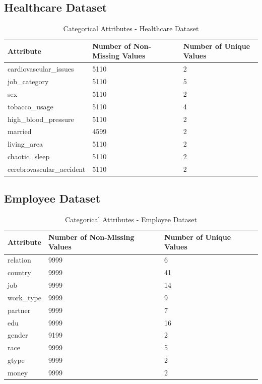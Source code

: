 \documentclass[a4paper,12pt]{article}
\begin{document}
\subsection{Healthcare Dataset}

\begin{table}[h!]
\centering
\caption{Categorical Attributes - Healthcare Dataset}
\vspace{0.5cm}
\small
\begin{tabularx}{\textwidth}{|l|X|X|}
\hline
\textbf{Attribute} & \textbf{Number of Non-Missing Values} & \textbf{Number of Unique Values} \\ \hline
cardiovascular\_issues & 5110 & 2 \\ \hline
job\_category & 5110 & 5 \\ \hline
sex & 5110 & 2 \\ \hline
tobacco\_usage & 5110 & 4 \\ \hline
high\_blood\_pressure & 5110 & 2 \\ \hline
married & 4599 & 2 \\ \hline
living\_area & 5110 & 2 \\ \hline
chaotic\_sleep & 5110 & 2 \\ \hline
cerebrovascular\_accident & 5110 & 2 \\ \hline
\end{tabularx}
\normalsize
\end{table}

\subsection{Employee Dataset}

\begin{table}[h!]
\centering
\caption{Categorical Attributes - Employee Dataset}
\vspace{0.5cm}
\small
\begin{tabularx}{\textwidth}{|l|X|X|}
\hline
\textbf{Attribute} & \textbf{Number of Non-Missing Values} & \textbf{Number of Unique Values} \\ \hline
relation & 9999 & 6 \\ \hline
country & 9999 & 41 \\ \hline
job & 9999 & 14 \\ \hline
work\_type & 9999 & 9 \\ \hline
partner & 9999 & 7 \\ \hline
edu & 9999 & 16 \\ \hline
gender & 9199 & 2 \\ \hline
race & 9999 & 5 \\ \hline
gtype & 9999 & 2 \\ \hline
money & 9999 & 2 \\ \hline
\end{tabularx}
\normalsize
\end{table}
\end{document}
